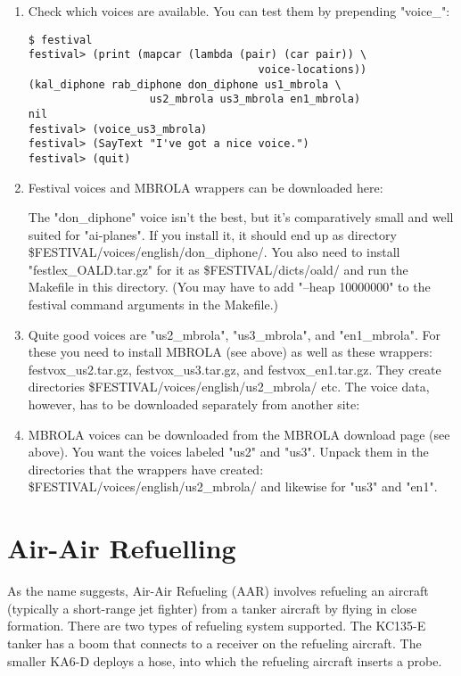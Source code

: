 \begin{enumerate}
\item Check which voices are available. You can test them by prepending "voice\_":

\begin{verbatim}
$ festival
festival> (print (mapcar (lambda (pair) (car pair)) \
                                    voice-locations))
(kal_diphone rab_diphone don_diphone us1_mbrola \
                   us2_mbrola us3_mbrola en1_mbrola)
nil
festival> (voice_us3_mbrola)
festival> (SayText "I've got a nice voice.")
festival> (quit)
\end{verbatim}

\item Festival voices and MBROLA wrappers can be downloaded here:

\web{http://festvox.org/packed/festival/1.95/}

The "don\_diphone" voice isn't the best,
but it's comparatively small and well suited for "ai-planes". If you install it,
it should end up as directory \$FESTIVAL/voices/english/don\_diphone/.
You also need to install "festlex\_OALD.tar.gz" for it as \$FESTIVAL/dicts/oald/ and
run the Makefile in this directory. (You may have to add "--heap 10000000" to the
festival command arguments in the Makefile.)

\item Quite good voices are "us2\_mbrola", "us3\_mbrola", and "en1\_mbrola". For these you need to
install MBROLA (see above) as well as these wrappers: festvox\_us2.tar.gz, festvox\_us3.tar.gz,
and festvox\_en1.tar.gz. They create directories \$FESTIVAL/voices/english/us2\_mbrola/ etc.
The voice data, however, has to be downloaded separately from another site:

\item MBROLA voices can be downloaded from the MBROLA download page (see above).
You want the voices labeled "us2" and "us3". Unpack them in the directories that
the wrappers have created: \$FESTIVAL/voices/english/us2\_mbrola/ and likewise for "us3" and "en1".

\end{enumerate}

\section{Air-Air Refuelling}\label{aar}

As the name suggests, Air-Air Refueling (AAR) involves refueling an aircraft
(typically a short-range jet fighter) from a tanker aircraft by flying in close
formation. There are two types of refueling system supported. The KC135-E tanker
has a boom that connects to a receiver on the refueling aircraft. The smaller
KA6-D deploys a hose, into which the refueling aircraft inserts a probe.

